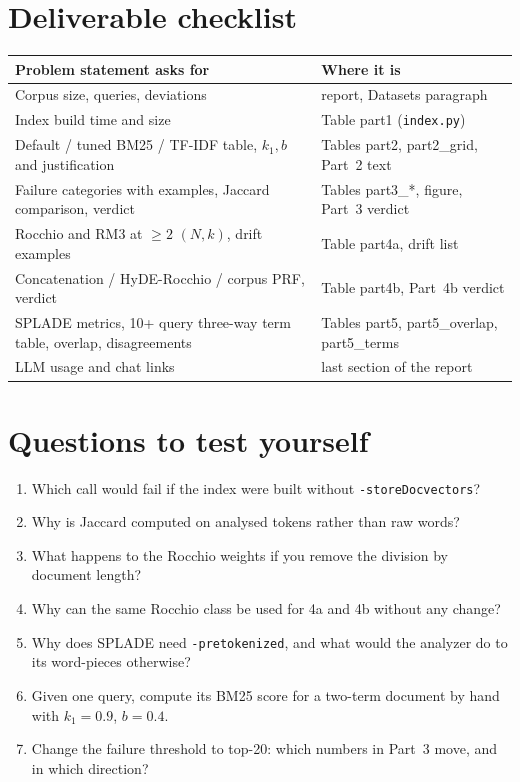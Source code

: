\documentclass[11pt,a4paper]{article}
\begin{document}
\section{Deliverable checklist}
\begin{tabular}{p{}p{}}\toprule
Problem statement asks for & Where it is \\ \midrule
Corpus size, queries, deviations & report, Datasets paragraph \\
Index build time and size & Table part1 (\texttt{index.py}) \\
Default / tuned BM25 / TF-IDF table, $k_1,b$ and justification & Tables part2, part2\_grid, Part~2 text \\
Failure categories with examples, Jaccard comparison, verdict & Tables part3\_*, figure, Part~3 verdict \\
Rocchio and RM3 at $\geq 2$ $(N,k)$, drift examples & Table part4a, drift list \\
Concatenation / HyDE-Rocchio / corpus PRF, verdict & Table part4b, Part~4b verdict \\
SPLADE metrics, 10+ query three-way term table, overlap, disagreements & Tables part5, part5\_overlap, part5\_terms \\
LLM usage and chat links & last section of the report \\ \bottomrule
\end{tabular}

\section{Questions to test yourself}
\begin{enumerate}[nosep]
  \item Which call would fail if the index were built without \texttt{-storeDocvectors}?
  \item Why is Jaccard computed on analysed tokens rather than raw words?
  \item What happens to the Rocchio weights if you remove the division by document length?
  \item Why can the same Rocchio class be used for 4a and 4b without any change?
  \item Why does SPLADE need \texttt{-pretokenized}, and what would the analyzer do to its word-pieces otherwise?
  \item Given one query, compute its BM25 score for a two-term document by hand with $k_1{=}0.9$, $b{=}0.4$.
  \item Change the failure threshold to top-20: which numbers in Part~3 move, and in which direction?
\end{enumerate}
\end{document}
